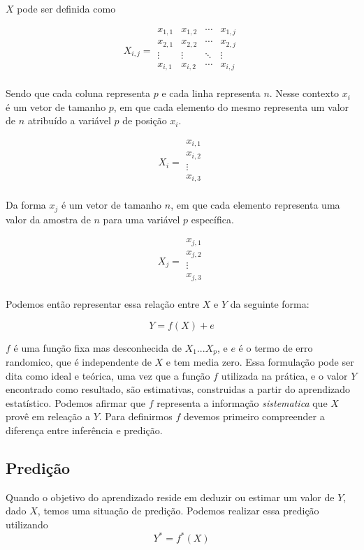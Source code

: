 $X$ pode ser definida como

\[
X_{i,j} = \begin{matrix}
x_{1,1} & x_{1,2} & \cdots & x_{1,j} \\
x_{2,1} & x_{2,2} & \cdots & x_{2,j} \\
\vdots  & \vdots  & \ddots & \vdots  \\
x_{i,1} & x_{i,2} & \cdots & x_{i,j} \\
\end{matrix}
\]

Sendo que cada coluna representa $p$ e cada linha representa $n$. Nesse contexto $x_i$ é um vetor de tamanho $p$, em que cada elemento do mesmo representa
um valor de $n$ atribuído a variável $p$ de posição $x_i$.

\[
X_{i} = \begin{matrix}
x_{i,1} \\
x_{i,2} \\
\vdots  \\
x_{i,3} \\
\end{matrix}
\]

Da  forma $x_j$ é um vetor de tamanho $n$, em que cada elemento representa uma valor da amostra de $n$ para uma variável $p$ específica.

\[
X_{j} = \begin{matrix}
x_{j,1} \\
x_{j,2} \\
\vdots  \\
x_{j,3} \\
\end{matrix}
\]

Podemos então representar essa relação entre $X$ e $Y$ da seguinte forma:

\[
  Y = f(X) + e
\]

$f$ é uma função fixa mas desconhecida de $X_1...X_p$, e $e$ é o termo de erro randomico, que é independente de $X$ e tem media zero. Essa formulação pode ser dita como ideal e teórica, uma vez que a função $f$ utilizada na prática, e o valor $Y$ encontrado como resultado, são estimativas, construidas a partir do aprendizado estatístico.
Podemos afirmar que $f$ representa a informação \textit{sistematica} que $X$ provê em releação a $Y$\cite{Jordan}.
Para definirmos $f$ devemos primeiro compreender a diferença entre inferência e predição.

\subsection{Predição}
Quando o objetivo do aprendizado reside em deduzir ou estimar um valor de $Y$, dado $X$, temos uma situação de predição. Podemos realizar essa predição utilizando
\[
  Y^* = f^*(X)
\]

